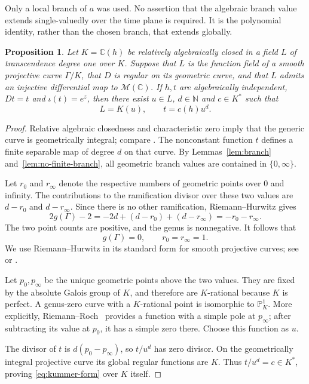\documentclass[11pt,reqno]{amsart}
\numberwithin{equation}{section}
\newtheorem{proposition}[theorem]{Proposition}
\theoremstyle{definition}
\theoremstyle{remark}
\newcommand{\C}{\mathbb C}
\newcommand{\N}{\mathbb N}
\newcommand{\PP}{\mathbb P}
\newcommand{\MM}{\mathcal M}
\begin{document}
Only a local branch of $a$ was used. No assertion that the algebraic
branch value extends single-valuedly over the time plane is required.
It is the polynomial identity, rather than the chosen branch, that
extends globally.

\begin{proposition}
\label{prop:two-point}
Let $K=\C(h)$ be relatively algebraically closed in a field $L$ of
transcendence degree one over $K$. Suppose that $L$ is the function
field of a smooth projective curve $\Gamma/K$, that $D$ is regular on
its geometric curve, and that $L$ admits an injective differential map
to $\MM(\C)$. If $h,t$ are algebraically independent,
$Dt=t$ and $\iota(t)=e^z$, then there exist
$u\in L$, $d\in\N$ and $c\in K^*$ such that
\begin{equation}
 L=K(u),\qquad t=c(h)u^d.
 \label{eq:kummer-form}
\end{equation}
\end{proposition}

\begin{proof}
Relative algebraic closedness and characteristic zero imply that the
generic curve is geometrically integral; compare
\cite[Chapter~III]{Stichtenoth2009}. The nonconstant function $t$
defines a finite separable map of degree $d$ on that curve. By
Lemmas~\ref{lem:branch} and~\ref{lem:no-finite-branch}, all geometric
branch values are contained in $\{0,\infty\}$.

Let $r_0$ and $r_\infty$ denote the respective numbers of geometric
points over $0$ and infinity. The contributions to the ramification
divisor over these two values are $d-r_0$ and $d-r_\infty$. Since
there is no other ramification, Riemann--Hurwitz gives
\begin{equation}
 2g(\Gamma)-2
 =-2d+(d-r_0)+(d-r_\infty)
 =-r_0-r_\infty.
 \label{eq:rh-two-point}
\end{equation}
The two point counts are positive, and the genus is nonnegative.
It follows that
\begin{equation}
 g(\Gamma)=0,\qquad r_0=r_\infty=1.
 \label{eq:genus-zero}
\end{equation}
We use Riemann--Hurwitz in its standard form for smooth projective
curves; see \cite[Chapter~IV, Section~2]{Hartshorne1977} or
\cite[Chapter~III]{Stichtenoth2009}.

Let $p_0,p_\infty$ be the unique geometric points above the two values.
They are fixed by the absolute Galois group of $K$, and therefore are
$K$-rational because $K$ is perfect. A genus-zero curve with a
$K$-rational point is isomorphic to $\PP^1_K$. More explicitly,
Riemann--Roch~\cite[Chapter~IV, Section~1]{Hartshorne1977} provides a function
with a simple pole at $p_\infty$; after subtracting its value at
$p_0$, it has a simple zero there. Choose this function as $u$.

The divisor of $t$ is $d(p_0-p_\infty)$, so $t/u^d$ has zero divisor.
On the geometrically integral projective curve its global regular
functions are $K$. Thus $t/u^d=c\in K^*$, proving
\eqref{eq:kummer-form} over $K$ itself.
\end{proof}
\end{document}
